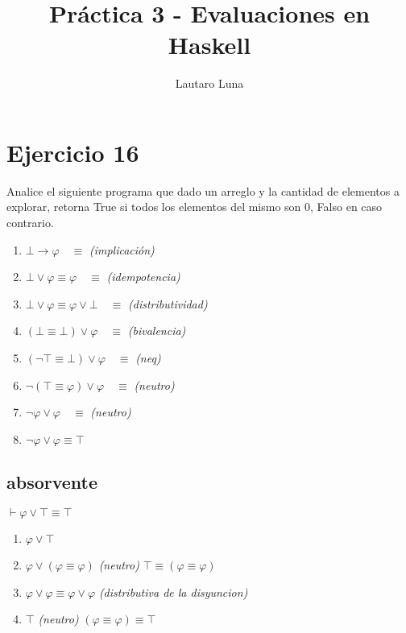 


\title{Práctica 3 - Evaluaciones en Haskell}

\author{Lautaro Luna}

\date{}

\maketitle

\vspace*{-1cm}

\section{Ejercicio 16}
Analice el siguiente programa que dado un arreglo y la cantidad de elementos a explorar, retorna
True si todos los elementos del mismo son 0, Falso en caso contrario.

\begin{enumerate}
    \item $\bot \to \varphi \quad \equiv$ \textit{(implicación)}
    \item $\bot \lor \varphi \equiv \varphi \quad \equiv$ \textit{(idempotencia)}
    \item $\bot \lor \varphi \equiv \varphi \lor \bot \quad \equiv$ \textit{(distributividad)}
    \item $(\bot \equiv \bot) \lor \varphi \quad \equiv$ \textit{(bivalencia)}
    \item $(\neg \top \equiv \bot) \lor \varphi \quad \equiv$ \textit{(neq)}
    \item $\neg (\top \equiv \varphi) \lor \varphi \quad \equiv$ \textit{(neutro)}
    \item $\neg \varphi \lor \varphi \quad \equiv$ \textit{(neutro)}
    \item $\neg \varphi \lor \varphi \equiv \top$
\end{enumerate}

\subsection{absorvente} \quad $\vdash \varphi \lor \top \equiv \top$

\begin{enumerate}
    \item $\varphi \lor \top$
    \item $\varphi \lor (\varphi \equiv \varphi)$ \textit{(neutro)} $\top \equiv (\varphi \equiv \varphi)$
    \item $\varphi \lor \varphi \equiv \varphi \lor \varphi$ \textit{(distributiva de la disyuncion)}
    \item $\top$ \textit{(neutro)} $(\varphi \equiv \varphi) \equiv \top$
\end{enumerate}


